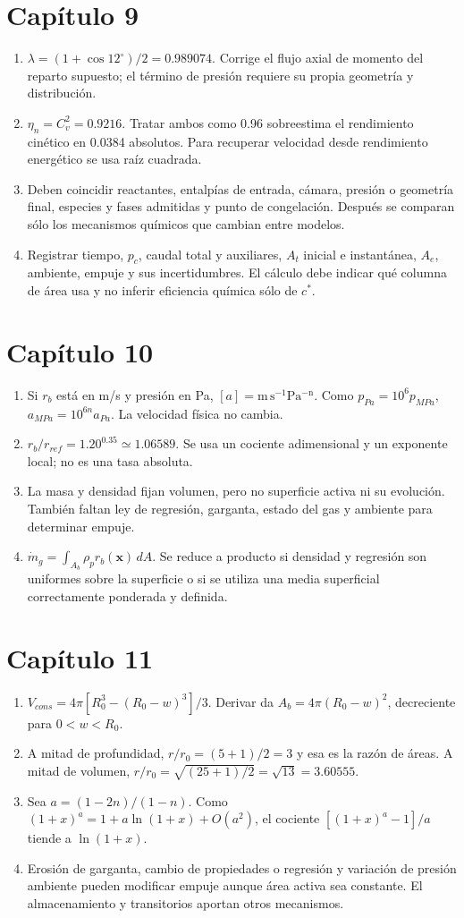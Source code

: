 \section*{Capítulo 9}
\begin{enumerate}
\item $\lambda=(1+\cos12^\circ)/2=0.989074$. Corrige el flujo axial de momento del reparto supuesto; el término de presión requiere su propia geometría y distribución.
\item $\eta_n=C_v^2=0.9216$. Tratar ambos como 0.96 sobreestima el rendimiento cinético en 0.0384 absolutos. Para recuperar velocidad desde rendimiento energético se usa raíz cuadrada.
\item Deben coincidir reactantes, entalpías de entrada, cámara, presión o geometría final, especies y fases admitidas y punto de congelación. Después se comparan sólo los mecanismos químicos que cambian entre modelos.
\item Registrar tiempo, $p_c$, caudal total y auxiliares, $A_t$ inicial e instantánea, $A_e$, ambiente, empuje y sus incertidumbres. El cálculo debe indicar qué columna de área usa y no inferir eficiencia química sólo de $c^*$.
\end{enumerate}
\section*{Capítulo 10}
\begin{enumerate}
\item Si $r_b$ está en m/s y presión en Pa, $[a]=\mathrm{m\,s^{-1}Pa^{-n}}$. Como $p_{Pa}=10^6p_{MPa}$, $a_{MPa}=10^{6n}a_{Pa}$. La velocidad física no cambia.
\item $r_b/r_{ref}=1.20^{0.35}\simeq1.06589$. Se usa un cociente adimensional y un exponente local; no es una tasa absoluta.
\item La masa y densidad fijan volumen, pero no superficie activa ni su evolución. También faltan ley de regresión, garganta, estado del gas y ambiente para determinar empuje.
\item $\dot m_g=\int_{A_b}\rho_pr_b(\mathbf x)\,dA$. Se reduce a producto si densidad y regresión son uniformes sobre la superficie o si se utiliza una media superficial correctamente ponderada y definida.
\end{enumerate}
\section*{Capítulo 11}
\begin{enumerate}
\item $V_{cons}=4\pi[R_0^3-(R_0-w)^3]/3$. Derivar da $A_b=4\pi(R_0-w)^2$, decreciente para $0<w<R_0$.
\item A mitad de profundidad, $r/r_0=(5+1)/2=3$ y esa es la razón de áreas. A mitad de volumen, $r/r_0=\sqrt{(25+1)/2}=\sqrt{13}=3.60555$.
\item Sea $a=(1-2n)/(1-n)$. Como $(1+x)^a=1+a\ln(1+x)+O(a^2)$, el cociente $[(1+x)^a-1]/a$ tiende a $\ln(1+x)$.
\item Erosión de garganta, cambio de propiedades o regresión y variación de presión ambiente pueden modificar empuje aunque área activa sea constante. El almacenamiento y transitorios aportan otros mecanismos.
\end{enumerate}
